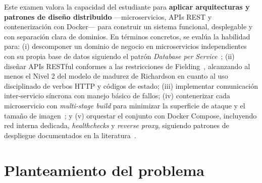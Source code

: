 \documentclass[11pt,a4paper]{article}
\begin{document}
Este examen valora la capacidad del estudiante para \textbf{aplicar arquitecturas y patrones de diseño distribuido} —microservicios, APIs REST y contenerización con Docker— para construir un sistema funcional, desplegable y con separación clara de dominios. En términos concretos, se evalúa la habilidad para: (i) descomponer un dominio de negocio en microservicios independientes con su propia base de datos siguiendo el patrón \emph{Database per Service}~\cite{Richardson2018Patterns}; (ii) diseñar APIs RESTful conformes a las restricciones de Fielding~\cite{Fielding2000REST}, alcanzando al menos el Nivel 2 del modelo de madurez de Richardson en cuanto al uso disciplinado de verbos HTTP y códigos de estado; (iii) implementar comunicación inter-servicio síncrona con manejo básico de fallos; (iv) contenerizar cada microservicio con \emph{multi-stage build} para minimizar la superficie de ataque y el tamaño de imagen~\cite{Newman2021Microservices}; y (v) orquestar el conjunto con Docker Compose, incluyendo red interna dedicada, \emph{healthchecks} y \emph{reverse proxy}, siguiendo patrones de despliegue documentados en la literatura~\cite{Aksakalli2021Deployment}.

\section{Planteamiento del problema}
\end{document}
